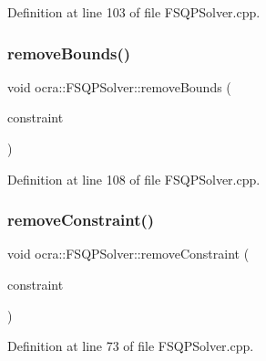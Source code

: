 Definition at line 103 of file F\+S\+Q\+P\+Solver.\+cpp.

\hypertarget{classocra_1_1FSQPSolver_a71f05cbd4b27427250eaa8207f42974f}{}\label{classocra_1_1FSQPSolver_a71f05cbd4b27427250eaa8207f42974f} 
\subsubsection{\texorpdfstring{remove\+Bounds()}{removeBounds()}\hspace{0.1cm}{\footnotesize\ttfamily [2/2]}}
{\footnotesize\ttfamily void ocra\+::\+F\+S\+Q\+P\+Solver\+::remove\+Bounds (\begin{DoxyParamCaption}\item[{\hyperlink{namespaceocra_a5fc023ff4ef8f4b0cdf410e088090731}{Identity\+Constraint} \&}]{constraint }\end{DoxyParamCaption})}



Definition at line 108 of file F\+S\+Q\+P\+Solver.\+cpp.

\hypertarget{classocra_1_1FSQPSolver_a80df07f05ec30a6a6f38997149806273}{}\label{classocra_1_1FSQPSolver_a80df07f05ec30a6a6f38997149806273} 
\subsubsection{\texorpdfstring{remove\+Constraint()}{removeConstraint()}\hspace{0.1cm}{\footnotesize\ttfamily [1/2]}}
{\footnotesize\ttfamily void ocra\+::\+F\+S\+Q\+P\+Solver\+::remove\+Constraint (\begin{DoxyParamCaption}\item[{\hyperlink{namespaceocra_ae8b87cf4099be3efc3b410019ad2046e}{Linear\+Constraint} \&}]{constraint }\end{DoxyParamCaption})}



Definition at line 73 of file F\+S\+Q\+P\+Solver.\+cpp.

\hypertarget{classocra_1_1FSQPSolver_a80d729cccff0221d1afb8781c89bbc55}{}\label{classocra_1_1FSQPSolver_a80d729cccff0221d1afb8781c89bbc55} 
